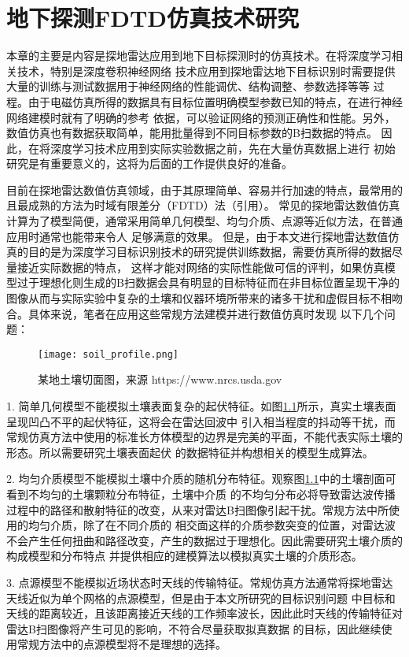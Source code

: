 \chapter{地下探测FDTD仿真技术研究}
本章的主要是内容是探地雷达应用到地下目标探测时的仿真技术。在将深度学习相关技术，特别是深度卷积神经网络
技术应用到探地雷达地下目标识别时需要提供大量的训练与测试数据用于神经网络的性能调优、结构调整、参数选择等等
过程。由于电磁仿真所得的数据具有目标位置明确模型参数已知的特点，在进行神经网络建模时就有了明确的参考
依据，可以验证网络的预测正确性和性能。另外，数值仿真也有数据获取简单，能用批量得到不同目标参数的B扫数据的特点。
因此，在将深度学习技术应用到实际实验数据之前，先在大量仿真数据上进行
初始研究是有重要意义的，这将为后面的工作提供良好的准备。

目前在探地雷达数值仿真领域，由于其原理简单、容易并行加速的特点，最常用的且最成熟的方法为时域有限差分（FDTD）法（引用）。
常见的探地雷达数值仿真计算为了模型简便，通常采用简单几何模型、均匀介质、点源等近似方法，在普通应用时通常也能带来令人
足够满意的效果。
但是，由于本文进行探地雷达数值仿真的目的是为深度学习目标识别技术的研究提供训练数据，需要仿真所得的数据尽量接近实际数据的特点，
这样才能对网络的实际性能做可信的评判，如果仿真模型过于理想化则生成的B扫数据会具有明显的目标特征而在非目标位置呈现干净的
图像从而与实际实验中复杂的土壤和仪器环境所带来的诸多干扰和虚假目标不相吻合。具体来说，笔者在应用这些常规方法建模并进行数值仿真时发现
以下几个问题：
\begin{figure}[htbp]
	\texttt{[image: soil\_profile.png]}
	\caption{某地土壤切面图，来源 https://www.nrcs.usda.gov}
	\label{soil_profile}
\end{figure}

1. 简单几何模型不能模拟土壤表面复杂的起伏特征。如图\ref{soil_profile}所示，真实土壤表面呈现凹凸不平的起伏特征，这将会在雷达回波中
引入相当程度的抖动等干扰，而常规仿真方法中使用的标准长方体模型的边界是完美的平面，不能代表实际土壤的形态。所以需要研究土壤表面起伏
的数据特征并构想相关的模型生成算法。

2. 均匀介质模型不能模拟土壤中介质的随机分布特征。观察图\ref{soil_profile}中的土壤剖面可看到不均匀的土壤颗粒分布特征，土壤中介质
的不均匀分布必将导致雷达波传播过程中的路径和散射特征的改变，从来对雷达B扫图像引起干扰。常规方法中所使用的均匀介质，除了在不同介质的
相交面这样的介质参数突变的位置，对雷达波不会产生任何扭曲和路径改变，产生的数据过于理想化。因此需要研究土壤介质的构成模型和分布特点
并提供相应的建模算法以模拟真实土壤的介质形态。

3. 点源模型不能模拟近场状态时天线的传输特征。常规仿真方法通常将探地雷达天线近似为单个网格的点源模型，但是由于本文所研究的目标识别问题
中目标和天线的距离较近，且该距离接近天线的工作频率波长，因此此时天线的传输特征对雷达B扫图像将产生可见的影响，不符合尽量获取拟真数据
的目标，因此继续使用常规方法中的点源模型将不是理想的选择。

